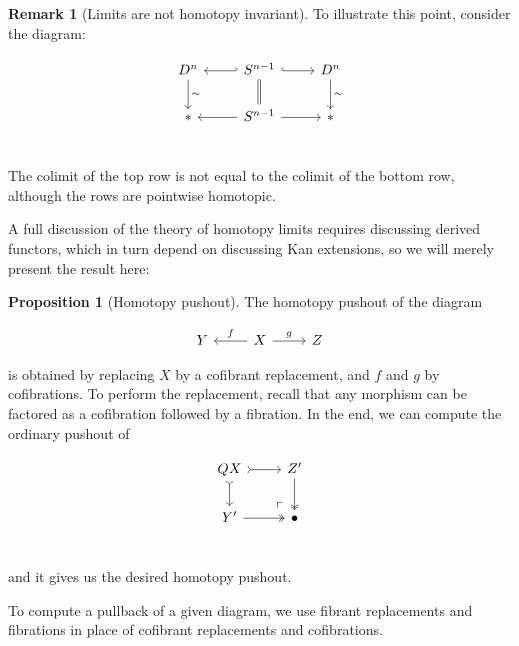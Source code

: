 \documentclass[10pt]{amsart}
\newcommand{\8}{\ensuremath{\infty}}
\newcommand{\0}{\ensuremath{\overset{\rightarrow}{0}}}
\newcommand{\1}{\ensuremath{\mathbf{1}}}
\theoremstyle{definition}
\newtheorem{proposition}[definition]{Proposition}
\newtheorem{remark}[definition]{Remark}
\numberwithin{definition}{subsection}
\numberwithin{definition}{section}
\begin{document}
\begin{remark}[Limits are not homotopy invariant]
  To illustrate this point, consider the diagram:

  \begin{equation*}
    \begin{tikzcd}
      D^n \arrow[d, "\sim"] \arrow[r, hookleftarrow] & S^{n - 1} \arrow[r, hookrightarrow] \arrow[d, equal] & D^n \arrow[d, "\sim"] \\
      * & S^{n - 1} \arrow[l] \arrow[r] & * \\
    \end{tikzcd}
  \end{equation*}

  The colimit of the top row is not equal to the colimit of the bottom row, although the rows are pointwise homotopic.
\end{remark}

A full discussion of the theory of homotopy limits requires discussing derived functors, which in turn depend on discussing Kan extensions, so we will merely present the result here:

\begin{proposition}[Homotopy pushout]
  The homotopy pushout of the diagram

  \begin{equation*}
    \begin{tikzcd}
      Y & X \arrow[l, "f"'] \arrow[r, "g"] & Z
    \end{tikzcd}
  \end{equation*}

  is obtained by replacing $X$ by a cofibrant replacement, and $f$ and $g$ by cofibrations. To perform the replacement, recall that any morphism can be factored as a cofibration followed by a fibration. In the end, we can compute the ordinary pushout of

  \begin{equation*}
    \begin{tikzcd}
      QX \arrow[d, rightarrowtail] \arrow[r, rightarrowtail] \arrow[dr, phantom, "\ulcorner", very near end] & Z' \arrow[d, twoheadrightarrow] \\
      Y' \arrow[r, twoheadrightarrow] & \bullet \\
    \end{tikzcd}
  \end{equation*}

  and it gives us the desired homotopy pushout.

  To compute a pullback of a given diagram, we use fibrant replacements and fibrations in place of cofibrant replacements and cofibrations.
\end{proposition}
\end{document}
